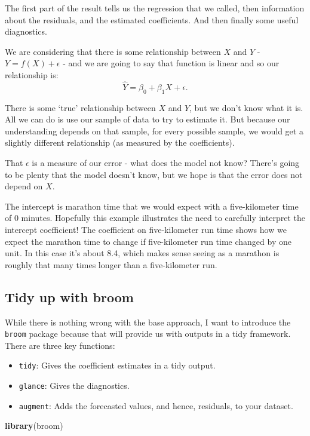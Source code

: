 \documentclass[
]{book}
\newenvironment{Shaded}{\begin{snugshade}}{\end{snugshade}}
\newcommand{\KeywordTok}[1]{\textcolor[rgb]{0.13,0.29,0.53}{\textbf{#1}}}
\newcommand{\NormalTok}[1]{#1}
\providecommand{\tightlist}{%
  \setlength{\itemsep}{0pt}\setlength{\parskip}{0pt}}
\begin{document}
The first part of the result tells us the regression that we called, then information about the residuals, and the estimated coefficients. And then finally some useful diagnostics.

We are considering that there is some relationship between \(X\) and \(Y\) - \(Y = f(X) + \epsilon\) - and we are going to say that function is linear and so our relationship is:
\[\hat{Y} = \beta_0 + \beta_1 X + \epsilon.\]

There is some `true' relationship between \(X\) and \(Y\), but we don't know what it is. All we can do is use our sample of data to try to estimate it. But because our understanding depends on that sample, for every possible sample, we would get a slightly different relationship (as measured by the coefficients).

That \(\epsilon\) is a measure of our error - what does the model not know? There's going to be plenty that the model doesn't know, but we hope is that the error does not depend on \(X\).

The intercept is marathon time that we would expect with a five-kilometer time of 0 minutes. Hopefully this example illustrates the need to carefully interpret the intercept coefficient! The coefficient on five-kilometer run time shows how we expect the marathon time to change if five-kilometer run time changed by one unit. In this case it's about 8.4, which makes sense seeing as a marathon is roughly that many times longer than a five-kilometer run.

\hypertarget{tidy-up-with-broom}{%
\subsection{Tidy up with broom}\label{tidy-up-with-broom}}

While there is nothing wrong with the base approach, I want to introduce the \texttt{broom} package because that will provide us with outputs in a tidy framework. There are three key functions:

\begin{itemize}
\tightlist
\item
  \texttt{tidy}: Gives the coefficient estimates in a tidy output.
\item
  \texttt{glance}: Gives the diagnostics.
\item
  \texttt{augment}: Adds the forecasted values, and hence, residuals, to your dataset.
\end{itemize}

\begin{Shaded}
\begin{Highlighting}[]
\KeywordTok{library}\NormalTok{(broom)}
\end{Highlighting}
\end{Shaded}
\end{document}
